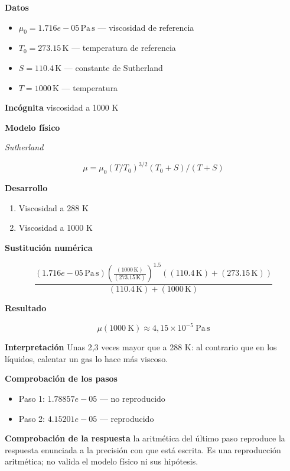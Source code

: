 \documentclass[10pt,openany]{book}
\begin{document}
\noindent\textbf{Datos}
\begin{itemize}
\item $\mu_{0} = 1.716e-05\,\mathrm{Pa}\,\mathrm{s}$ — viscosidad de referencia
\item $T_{0} = 273.15\,\mathrm{K}$ — temperatura de referencia
\item $S = 110.4\,\mathrm{K}$ — constante de Sutherland
\item $T = 1000\,\mathrm{K}$ — temperatura
\end{itemize}

\noindent\textbf{Incógnita}
viscosidad a 1000 K

\noindent\textbf{Modelo físico}

\noindent\textit{Sutherland}

\[
\mu = \mu_0 (T/T_0)^{3/2}(T_0+S)/(T+S)
\]

\noindent\textbf{Desarrollo}
\begin{enumerate}
\item
Viscosidad a 288 K
\item
Viscosidad a 1000 K
\end{enumerate}

\noindent\textbf{Sustitución numérica}

\[
\frac{\left(1.716e-05\,\mathrm{Pa}\,\mathrm{s}\right) \left(\frac{\left(1000\,\mathrm{K}\right)}{\left(273.15\,\mathrm{K}\right)}\right)^{1.5} \left(\left(110.4\,\mathrm{K}\right) + \left(273.15\,\mathrm{K}\right)\right)}{\left(110.4\,\mathrm{K}\right) + \left(1000\,\mathrm{K}\right)}
\]

\noindent\textbf{Resultado}

\[
\mu(1000\ \mathrm{K}) \approx 4{,}15\times 10^{-5}\ \mathrm{Pa\,s}
\]

\noindent\textbf{Interpretación}
Unas 2,3 veces mayor que a 288 K: al contrario que en los líquidos, calentar un gas lo hace más viscoso.

\noindent\textbf{Comprobación de los pasos}
\begin{itemize}
\item Paso 1: $1.78857e-05$ — no reproducido
\item Paso 2: $4.15201e-05$ — reproducido
\end{itemize}

\noindent\textbf{Comprobación de la respuesta} la aritmética del último paso reproduce la respuesta enunciada a la precisión con que está escrita. Es una reproducción aritmética; no valida el modelo físico ni sus hipótesis.
\end{document}
